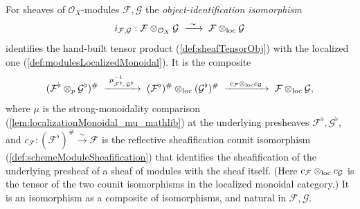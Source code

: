 \begin{definition}



  \label{def:tensorObjLocalizedIso}
  For sheaves of \(\mathcal{O}_X\)-modules \(\mathcal{F}, \mathcal{G}\) the
  \emph{object-identification isomorphism}
  \[
    i_{\mathcal{F},\mathcal{G}} :
      \mathcal{F} \otimes_{\mathcal{O}_X} \mathcal{G}
      \;\xrightarrow{\ \sim\ }\;
      \mathcal{F} \mathbin{\otimes_{\mathrm{loc}}} \mathcal{G}
  \]
  identifies the hand-built tensor product (\cref{def:sheafTensorObj}) with the
  localized one (\cref{def:modulesLocalizedMonoidal}). It is the composite
  \[
    (\mathcal{F}^{\flat} \otimes_p \mathcal{G}^{\flat})^{\#}
      \;\xrightarrow{\ \mu_{\mathcal{F}^{\flat},\,\mathcal{G}^{\flat}}^{-1}\ }\;
      (\mathcal{F}^{\flat})^{\#} \lotimes (\mathcal{G}^{\flat})^{\#}
      \;\xrightarrow{\ c_{\mathcal{F}} \lotimes c_{\mathcal{G}}\ }\;
      \mathcal{F} \lotimes \mathcal{G},
  \]
  where \(\mu\) is the strong-monoidality comparison
  (\cref{lem:localizationMonoidal_mu_mathlib}) at the underlying presheaves
  \(\mathcal{F}^{\flat}, \mathcal{G}^{\flat}\), and
  \(c_{\mathcal{F}} : (\mathcal{F}^{\flat})^{\#} \xrightarrow{\sim} \mathcal{F}\)
  is the reflective sheafification counit isomorphism
  (\cref{def:schemeModuleSheafification}) that identifies the sheafification of the
  underlying presheaf of a sheaf of modules with the sheaf itself. (Here
  \(c_{\mathcal{F}} \mathbin{\otimes_{\mathrm{loc}}} c_{\mathcal{G}}\) is the tensor of the two counit
  isomorphisms in the localized monoidal category.) It is an isomorphism as a
  composite of isomorphisms, and natural in \(\mathcal{F}, \mathcal{G}\).
\end{definition}

